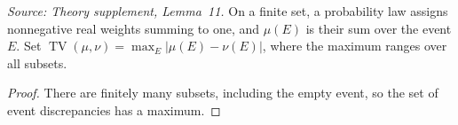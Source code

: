 \begin{definition}
  \label{def:total-variation}
  \leanok
  \textit{Source: Theory supplement, Lemma~11.}
  On a finite set, a probability law assigns nonnegative real weights
  summing to one, and \(\mu(E)\) is their sum over the event \(E\).
  Set \(\operatorname{TV}(\mu,\nu)=\max_E|\mu(E)-\nu(E)|\),
  where the maximum ranges over all subsets.
\end{definition}
\begin{proof}
  \leanok
  There are finitely many subsets, including the empty event, so the
  set of event discrepancies has a maximum.
\end{proof}

